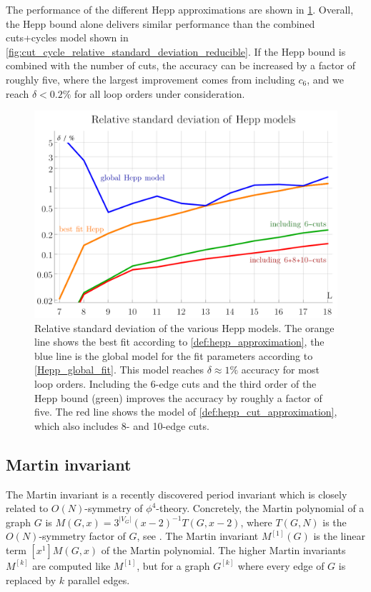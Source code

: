 \documentclass[11pt]{scrartcl}
\numberwithin{equation}{section}
\newcommand{\abs}[1]{\lvert #1 \rvert}
\begin{document}
The performance of the different Hepp approximations are shown in \cref{fig:hepp_standard_deviation}. Overall, the Hepp bound alone delivers similar performance than the combined cuts+cycles model shown in \cref{fig:cut_cycle_relative_standard_deviation_reducible}. If the Hepp bound is combined with the number of cuts, the accuracy can be increased by a factor of roughly five, where the largest improvement comes from including $c_6$, and we reach $\delta < 0.2\%$ for all loop orders under consideration.









\begin{figure}[htb]
	\centering
	\includegraphics[width=.6\linewidth]{figures/hepp_standard_deviation}
	\caption{  Relative standard deviation of the various Hepp models. The orange line shows the best fit according to \cref{def:hepp_approximation}, the blue line is the global model for the fit parameters according to \cref{Hepp_global_fit}. This model reaches $\delta \approx 1\%$ accuracy for most loop orders. Including the 6-edge cuts and the third order of the Hepp bound (green) improves the accuracy by roughly a factor of five. The red line shows the model of \cref{def:hepp_cut_approximation}, which also includes 8- and 10-edge cuts.
	}
	\label{fig:hepp_standard_deviation}
	
\end{figure}





\subsection{Martin invariant}\label{sec:martin}


The Martin invariant \cite{panzer_feynman_2023} is a recently discovered period invariant which is closely related to  $O(N)$-symmetry of $\phi^4$-theory. Concretely, the Martin polynomial of a graph $G$ is $M(G,x)=3^{\abs{V_G}}(x-2)^{-1}  T(G,x-2) $, where  $T(G,N)$ is the $O(N)$-symmetry factor of $G$, see \cite{balduf_statistics_2023}. The Martin invariant $M^{[1]}(G)$ is the linear term   $[x^1]M(G,x)$ of the Martin polynomial. The higher Martin invariants $M^{[k]}$ are computed like $M^{[1]}$, but for a graph $G^{[k]}$ where every edge of $G$ is replaced by $k$ parallel edges. 
\end{document}
